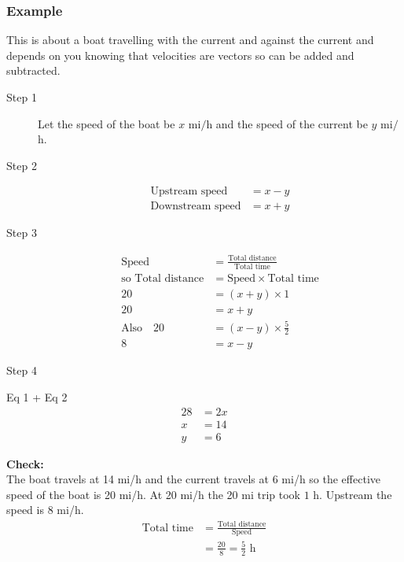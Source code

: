 \subsubsection{Example}
This is about a boat travelling with the current and against the current and depends
on you knowing that velocities are vectors so can be added and subtracted. 


\begin{description}
	\item [Step 1] Let the speed of the boat be $x$ \mbox{mi}$/$\mbox{h} and the speed of the current be $y$ \mbox{mi}$/$\mbox{h}. 
	
	\item [Step
	2]
	\begin{align*}\text{Upstream speed} &  =  x -y \\
	\text{Downstream speed} &  =  x +y\end{align*}
	
	\item [Step 3]
	\begin{align}\text{Speed} &  =  \frac{\text{Total distance}}{\text{Total time}} \nonumber  \\
	\text{so Total distance} &  =  \text{Speed} \times \text{Total time} \nonumber  \\
	20 &  =  \left (x +y\right ) \times 1 \nonumber  \\
	20 &=x +y \tag{1} \\
	\text{Also}\quad 20 &  =  \left (x -y\right ) \times \frac{5}{2} \nonumber  \\
	8 &=x -y \tag{2}\end{align}
	
	\item [Step 4] \end{description}

Eq 1 + Eq 2
\begin{align*}28 &  =  2 x \\
x &  =  14 \\
y &  =  6\end{align*}

\textbf{Check:} \\\relax The boat travels
at 14 $\mbox{mi}$/$\mbox{h}$ and the current travels at 6 $\mbox{mi}$/$\mbox{h}$ so the effective speed of the
boat is 20 $\mbox{mi}$/$\mbox{h}$. At 20 $\mbox{mi}$/$\mbox{h}$ the 20 $\mbox{mi}$ trip took $1$ $\mbox{h}$. Upstream the speed is 8 $\mbox{mi}$/$\mbox{h}$. \
\begin{align*}\text{Total time} &  =  \frac{\text{Total distance}}{\text{Speed}} \\
&  =  \frac{20}{8} =\frac{5}{2} \text{ h}\end{align*}

